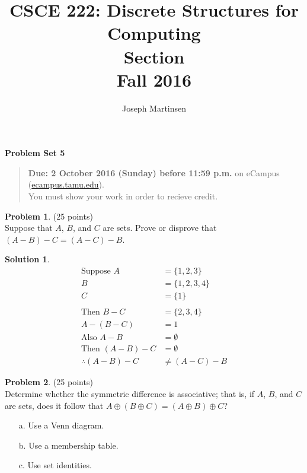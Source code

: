 \documentclass{article}
\title{CSCE 222: Discrete Structures for Computing\\Section \mysectionnumber\\Fall 2016}
\author{Joseph Martinsen}
\theoremstyle{definition}
\newtheorem{problem}{Problem}
\newtheorem*{solution}{Solution}
\newcommand{\problemset}[1]{\begin{center}\textbf{Problem Set #1}\end{center}}
\newcommand{\duedate}[1]{\begin{quote}\textbf{Due: #1} on eCampus (\url{ecampus.tamu.edu}). \\You must show your work in order to recieve credit.\end{quote}}
\begin{document}
\maketitle

\problemset{5}

\duedate{2 October 2016 (Sunday) before 11:59 p.m.}

\bigskip

\begin{problem} (25 points)\\
Suppose that $A$, $B$, and $C$ are sets. Prove or disprove that $(A-B)-C=(A-C)-B$.
\end{problem}

\begin{solution}\ \\
  \begin{equation*}
      \begin{aligned}
          \text{Suppose }  A &= \{1,2,3\} \\
                           B &= \{1,2,3,4\} \\
                           C &= \{1\} \\ \ \\
            \text{Then } B-C &= \{2,3,4\} \\
                     A-(B-C) &= {1} \\
            \text{Also } A-B &= \emptyset \\
        \text{Then } (A-B)-C &= \emptyset \\
          \therefore (A-B)-C &\neq (A-C)-B
      \end{aligned}
    \end{equation*}
\end{solution}

\newpage

\begin{problem} (25 points)\\
Determine whether the symmetric difference is associative; that is, if $A$, $B$, and $C$ are sets, does it follow that $A \oplus (B \oplus C) = (A \oplus B) \oplus C$?
\begin{enumerate}
\item[a.] Use a Venn diagram.
\item[b.] Use a membership table.
\item[c.] Use set identities.
\end{enumerate}
\end{problem}
\end{document}
